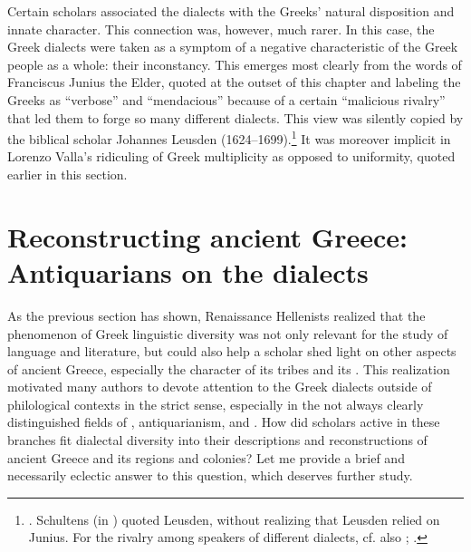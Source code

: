 Certain scholars associated the dialects with the Greeks’ natural disposition and innate character. This connection was, however, much rarer. In this case, the Greek dialects were taken as a symptom of a negative characteristic of the Greek people as a whole: their inconstancy. This emerges most clearly from the words of Franciscus Junius the Elder, quoted at the outset of this chapter and labeling the Greeks as “verbose” and “mendacious” because of a certain “malicious rivalry” that led them to forge so many different dialects. This view was silently copied by the  biblical scholar Johannes Leusden (1624–1699).\footnote{\citet[a.4\textsc{\textsuperscript{r}}\textsc{–}a.4\textsc{\textsuperscript{v}}, 167]{Leusden1656}. Schultens (in \citet[§\textsc{xlix.}δ]{Eskhult_albert_nodate}) quoted Leusden, without realizing that Leusden relied on Junius. For the rivalry among speakers of different dialects, cf. also \citet[5\textsc{\textsuperscript{r}}]{Baile1588}; \citet[\textsc{b.3}\textsc{\textsuperscript{r}}]{Schorling1678}.} It was moreover implicit in Lorenzo Valla’s ridiculing of Greek multiplicity as opposed to  uniformity, quoted earlier in this section.

\section{Reconstructing ancient Greece: Antiquarians on the dialects}\label{sec:7.6}


As the previous section has shown, Renaissance Hellenists realized that the phenomenon of Greek linguistic diversity was not only relevant for the study of language and literature, but could also help a scholar shed light on other aspects of ancient Greece, especially the character of its tribes and its . This realization motivated many authors to devote attention to the Greek dialects outside of philological contexts in the strict sense, especially in the not always clearly distinguished fields of , antiquarianism, and . How did scholars active in these branches fit dialectal diversity into their descriptions and reconstructions of ancient Greece and its regions and colonies? Let me provide a brief and necessarily eclectic answer to this question, which deserves further study.

